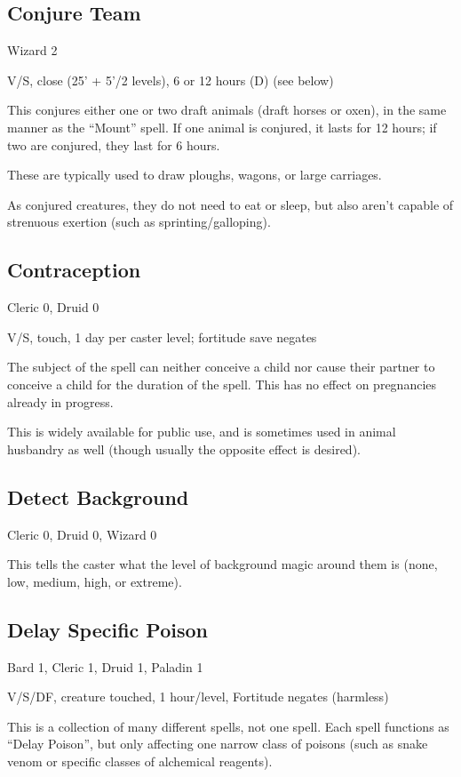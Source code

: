 %
\subsection{Conjure Team}

Wizard 2

V/S, close (25' + 5'/2 levels), 6 or 12 hours (D) (see below)

This conjures either one or two draft animals (draft horses or oxen), in
the same manner as the ``Mount'' spell. If one animal is conjured, it lasts
for 12 hours; if two are conjured, they last for 6 hours.

These are typically used to draw ploughs, wagons, or large carriages.

As conjured creatures, they do not need to eat or sleep, but also aren't
capable of strenuous exertion (such as sprinting/galloping).
%

%
\subsection{Contraception}
Cleric 0, Druid 0

V/S, touch, 1 day per caster level; fortitude save negates

The subject of the spell can neither conceive a child nor cause their
partner to conceive a child for the duration of the spell. This has no
effect on pregnancies already in progress.

This is widely available for public use, and is sometimes used in animal
husbandry as well (though usually the opposite effect is desired).
%

%
\subsection{Detect Background}

Cleric 0, Druid 0, Wizard 0

This tells the caster what the level of background magic around them is
(none, low, medium, high, or extreme).
%

%
\subsection{Delay Specific Poison}

Bard 1, Cleric 1, Druid 1, Paladin 1

V/S/DF, creature touched, 1 hour/level, Fortitude negates (harmless)

This is a collection of many different spells, not one spell. Each spell
functions as ``Delay Poison'', but only affecting one narrow class of
poisons (such as snake venom or specific classes of alchemical reagents).

